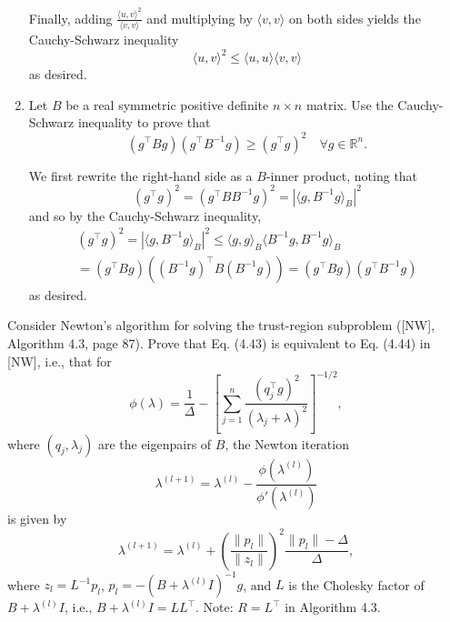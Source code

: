 \documentclass{../kin_math}
\begin{document}
\begin{questions}
\begin{enumerate}
\begin{solution}
\begin{equation*}
      \end{equation*}
      Finally, adding $\frac{\langle u, v \rangle^2}{\langle v, v \rangle}$ and multiplying by $\langle v, v \rangle$ on both sides yields the Cauchy-Schwarz inequality
      \begin{equation*}
        \langle u, v \rangle^2 \leq \langle u, u \rangle \langle v, v \rangle
      \end{equation*}
      as desired.
    \end{solution}
    \item Let $B$ be a real symmetric positive definite $n \times n$ matrix. Use the Cauchy-Schwarz inequality to prove that
    \begin{equation}
      (g^\top B g)(g^\top B^{-1} g) \geq (g^\top g)^2 \quad \forall g \in \mathbb{R}^n.
    \end{equation}
    \begin{solution}
      We first rewrite the right-hand side as a $B$-inner product, noting that
      \begin{equation*}
        (g^\top g)^2 = (g^\top B B^{-1} g)^2 = |\langle g, B^{-1} g \rangle_B|^2
      \end{equation*}
      and so by the Cauchy-Schwarz inequality,
      \begin{multline*}
        (g^\top g)^2 = |\langle g, B^{-1} g \rangle_B|^2 \leq \langle g, g \rangle_B \langle B^{-1} g, B^{-1} g \rangle_B \\
        = (g^\top  B g) ((B^{-1} g)^\top B (B^{-1} g)) = (g^\top B g) (g^\top B^{-1} g)
      \end{multline*}
      as desired.
    \end{solution}
  \end{enumerate}

  \question Consider Newton’s algorithm for solving the trust-region subproblem ([NW], Algorithm 4.3, page 87). Prove that Eq. (4.43) is equivalent to Eq. (4.44) in [NW], i.e., that for
  \begin{equation*}
    \phi(\lambda) = \frac{1}{\Delta} - \left[\sum_{j = 1}^n \frac{(q_j^\top g)^2}{(\lambda_j + \lambda)^2}\right]^{-1 / 2},
  \end{equation*}
  where $(q_j, \lambda_j)$ are the eigenpairs of $B$, the Newton iteration
  \begin{equation*}
    \lambda^{(l + 1)} = \lambda^{(l)} - \frac{\phi(\lambda^{(l)})}{\phi'(\lambda^{(l)})}
  \end{equation*}
  is given by
  \begin{equation*}
    \lambda^{(l + 1)} = \lambda^{(l)} + \left(\frac{\lVert p_l \rVert}{\lVert z_l \rVert}\right)^2 \frac{\lVert p_l \rVert - \Delta}{\Delta},
  \end{equation*}
  where $z_l = L^{-1} p_l$, $p_l = -(B + \lambda^{(l)} I)^{-1} g$, and $L$ is the Cholesky factor of $B + \lambda^{(l)} I$, i.e., $B + \lambda^{(l)} I = LL^\top$. Note: $R = L^\top$ in Algorithm 4.3.


\end{questions}
\end{document}
